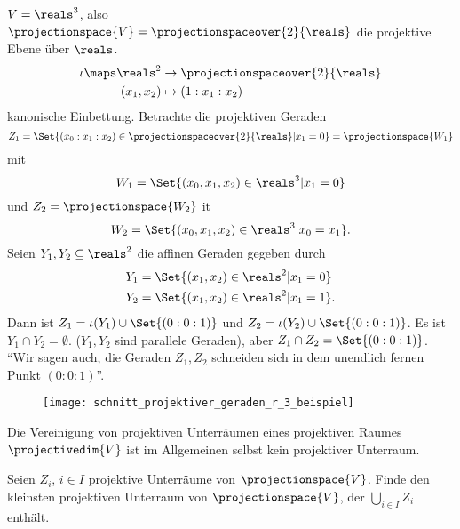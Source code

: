 \begin{beispiel}
  \( V=\reals^3 \), also \( \projectionspace{V}=\projectionspaceover{2}{\reals} \) die projektive Ebene über \( \reals \).
  \begin{equation*}
    \begin{split}
      \iota\maps \reals^2&\to \projectionspaceover{2}{\reals}\\
      (x_1,x_2)&\mapsto (1:x_1:x_2)
    \end{split}
  \end{equation*}
  kanonische Einbettung. Betrachte die projektiven Geraden
  \begin{equation*}
    Z_1=\Set{(x_0:x_1:x_2)\in \projectionspaceover{2}{\reals}|x_1=0}=\projectionspace{W_1}
  \end{equation*}
  mit
  \begin{equation*}
    W_1=\Set{(x_0,x_1,x_2)\in\reals^3|x_1=0}
  \end{equation*}
  und \( Z_2=\projectionspace{W_2} \) it
  \begin{equation*}
    W_2=\Set{(x_0,x_1,x_2)\in \reals^3|x_0=x_1}.
  \end{equation*}
  Seien \( Y_1,Y_2\subseteq \reals^2 \) die affinen Geraden gegeben durch
  \begin{align*}
    Y_1&=\Set{(x_1,x_2)\in\reals^2|x_1=0}\\
    Y_2&=\Set{(x_1,x_2)\in \reals^2|x_1=1}.
  \end{align*}
  Dann ist \( Z_1=\iota(Y_1)\cup \Set{(0:0:1)} \) und \( Z_2=\iota(Y_2)\cup \Set{(0:0:1)} \). Es ist \( Y_1\cap Y_2=\emptyset \). (\( Y_1,Y_2 \) sind parallele Geraden), aber \( Z_1\cap Z_2=\Set{(0:0:1)} \). \enquote{Wir sagen auch, die Geraden \( Z_1,Z_2 \) schneiden sich in dem unendlich fernen Punkt \( (0:0:1) \)}.
  \begin{figure}[H]
    \centering
    \texttt{[image: schnitt\_projektiver\_geraden\_r\_3\_beispiel]}
    \label{fig:schnitt_projektiver_geraden_r_3_beispiel}
  \end{figure}
\end{beispiel}
\begin{bemerkung*}
  Die Vereinigung von projektiven Unterräumen eines projektiven Raumes \( \projectivedim{V} \) ist im Allgemeinen selbst kein projektiver Unterraum.
\end{bemerkung*}
\begin{frage*}
  Seien \( Z_i \), \( i\in I \) projektive Unterräume von \( \projectionspace{V} \). Finde den kleinsten projektiven Unterraum von \( \projectionspace{V} \), der \( \bigcup_{i\in I}Z_i \) enthält.
\end{frage*}
